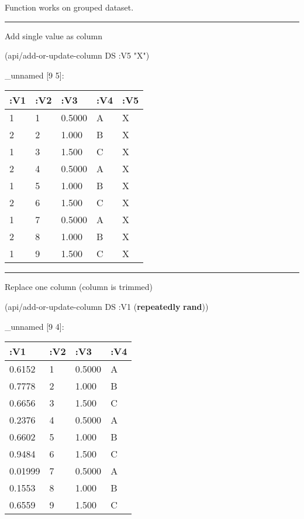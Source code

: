 \documentclass[]{article}
\newenvironment{Shaded}{\begin{snugshade}}{\end{snugshade}}
\newcommand{\KeywordTok}[1]{\textcolor[rgb]{0.13,0.29,0.53}{\textbf{#1}}}
\newcommand{\StringTok}[1]{\textcolor[rgb]{0.31,0.60,0.02}{#1}}
\newcommand{\AttributeTok}[1]{\textcolor[rgb]{0.77,0.63,0.00}{#1}}
\newcommand{\NormalTok}[1]{#1}
\begin{document}
Function works on grouped dataset.

\begin{center}\rule{0.5\linewidth}{0.5pt}\end{center}

Add single value as column

\begin{Shaded}
\begin{Highlighting}[]
\NormalTok{(api/add-or-update-column DS }\AttributeTok{:V5} \StringTok{"X"}\NormalTok{)}
\end{Highlighting}
\end{Shaded}

\_unnamed {[}9 5{]}:

\begin{longtable}[]{@{}lllll@{}}
\toprule
:V1 & :V2 & :V3 & :V4 & :V5\tabularnewline
\midrule
\endhead
1 & 1 & 0.5000 & A & X\tabularnewline
2 & 2 & 1.000 & B & X\tabularnewline
1 & 3 & 1.500 & C & X\tabularnewline
2 & 4 & 0.5000 & A & X\tabularnewline
1 & 5 & 1.000 & B & X\tabularnewline
2 & 6 & 1.500 & C & X\tabularnewline
1 & 7 & 0.5000 & A & X\tabularnewline
2 & 8 & 1.000 & B & X\tabularnewline
1 & 9 & 1.500 & C & X\tabularnewline
\bottomrule
\end{longtable}

\begin{center}\rule{0.5\linewidth}{0.5pt}\end{center}

Replace one column (column is trimmed)

\begin{Shaded}
\begin{Highlighting}[]
\NormalTok{(api/add-or-update-column DS }\AttributeTok{:V1}\NormalTok{ (}\KeywordTok{repeatedly} \KeywordTok{rand}\NormalTok{))}
\end{Highlighting}
\end{Shaded}

\_unnamed {[}9 4{]}:

\begin{longtable}[]{@{}llll@{}}
\toprule
:V1 & :V2 & :V3 & :V4\tabularnewline
\midrule
\endhead
0.6152 & 1 & 0.5000 & A\tabularnewline
0.7778 & 2 & 1.000 & B\tabularnewline
0.6656 & 3 & 1.500 & C\tabularnewline
0.2376 & 4 & 0.5000 & A\tabularnewline
0.6602 & 5 & 1.000 & B\tabularnewline
0.9484 & 6 & 1.500 & C\tabularnewline
0.01999 & 7 & 0.5000 & A\tabularnewline
0.1553 & 8 & 1.000 & B\tabularnewline
0.6559 & 9 & 1.500 & C\tabularnewline
\bottomrule
\end{longtable}
\end{document}
